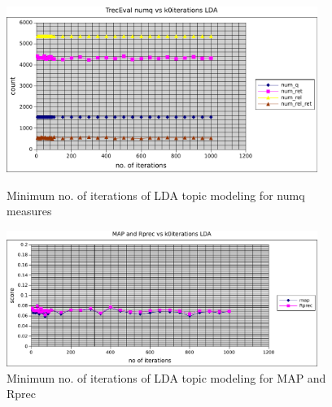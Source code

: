 \begin{figure}
    \centering
    \begin{minipage}{0.45\textwidth}
        \centering
        \includegraphics[width=0.9\textwidth]{fig/numq_k0iter_lda.pdf}
        \caption{Minimum no. of iterations of LDA topic modeling for numq measures}
    \end{minipage}\hfill
    \begin{minipage}{0.45\textwidth}
        \centering
        \includegraphics[width=0.9\textwidth]{fig/map_rprec_k0iter_lda.pdf}
        \caption{Minimum no. of iterations of LDA topic modeling for MAP and Rprec}
    \end{minipage}
\end{figure}
